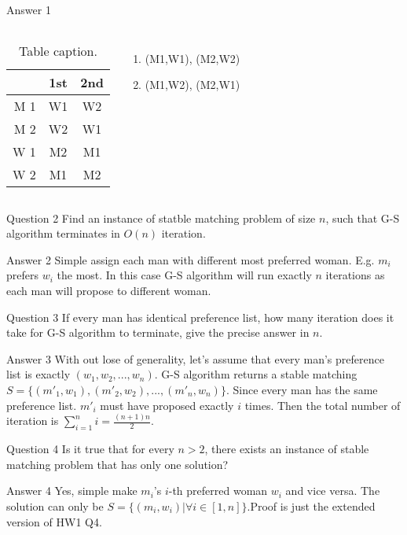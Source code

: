 \documentclass{beamer}
\begin{document}
\begin{frame}{Answer 1}
	\begin{columns}
	\begin{table}
		\centering
		\begin{tabular}{r|cc}
				 &  1st & 2nd \\\hline
			M 1 & W1 & W2 \\
			M 2 & W2 & W1 \\
			W 1 & M2 & M1 \\
			W 2 & M1 & M2 \\
		\end{tabular}
		\caption{Table caption.}
		\label{tab:demo}
	\end{table}
	\begin{enumerate}
		\item<1-> \alert{(M1,W1), (M2,W2)}
		\item<2-> (M1,W2), (M2,W1)
	\end{enumerate}
	\end{columns}
\end{frame}

\begin{frame}{Question 2}
	Find an instance of statble matching problem of size $n$, such that G-S algorithm terminates in $O(n)$ iteration.
\end{frame}

\begin{frame}{Answer 2}
	Simple assign each man with different most preferred woman. E.g. $m_i$ prefers $w_i$ the most. In this case G-S
	algorithm will run exactly $n$ iterations as each man will propose to different woman.
\end{frame}
\begin{frame}{Question 3}
	If every man has identical preference list, how many iteration does it take for G-S algorithm to terminate, give the
	precise answer in $n$.
\end{frame}
\begin{frame}{Answer 3}
	With out lose of generality, let's assume that every man's preference list is exactly $(w_1, w_2, ..., w_n)$. G-S
	algorithm returns a stable matching $S = \{(m'_1,w_1), (m'_2,w_2), ..., (m'_n,w_n)\}$. Since every man has the same
	preference list. $m'_i$ must have proposed exactly $i$ times. Then the total number of iteration is $\sum_{i=1}^{n}
	i= \frac{(n+1)n}{2}$.
\end{frame}
\begin{frame}{Question 4}
	Is it true that for every $n > 2$, there exists an instance of stable matching problem that has only one solution?
\end{frame}
\begin{frame}{Answer 4}
	Yes, simple make $m_i$'s $i$-th preferred woman $w_i$ and vice versa. The solution can only be $S = \{(m_i,w_i) |
	\forall i \in [1,n]\}. $Proof is just the extended version of HW1 Q4.
\end{frame}
\end{document}
